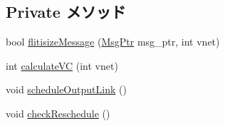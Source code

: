 \subsection*{Private メソッド}
\begin{DoxyCompactItemize}
\item 
bool \hyperlink{classNetworkInterface__d_a12a9945591ab6cd27b4cf0df84786cf8}{flitisizeMessage} (\hyperlink{classRefCountingPtr}{MsgPtr} msg\_\-ptr, int vnet)
\item 
int \hyperlink{classNetworkInterface__d_ab27658cc3136de94d2d08c78ac499aff}{calculateVC} (int vnet)
\item 
void \hyperlink{classNetworkInterface__d_a0b5091af4210988da9a7eeb44e5691e4}{scheduleOutputLink} ()
\item 
void \hyperlink{classNetworkInterface__d_af954e8e2150e2ce2e1b87081bbd9c678}{checkReschedule} ()
\end{DoxyCompactItemize}

